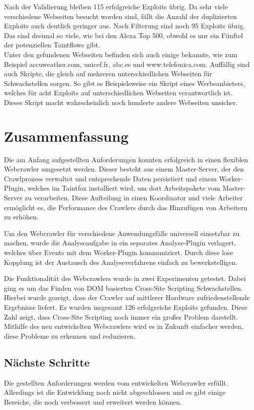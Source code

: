 Nach der Validierung bleiben 115 erfolgreiche Exploits übrig. Da sehr viele verschiedene Webseiten besucht worden sind, fällt die Anzahl der duplizierten Exploits auch deutlich geringer aus. Nach Filterung sind noch 95 Exploits übrig. Das sind dreimal so viele, wie bei den Alexa Top 500, obwohl es nur ein Fünftel der potenziellen Taintflows gibt. \\
Unter den gefundenen Webseiten befinden sich auch einige bekannte, wie zum Beispiel accuweather.com, unicef.fr, abc.es und www.telefonica.com. Auffällig sind auch Skripte, die gleich auf mehreren unterschiedlichen Webseiten für Schwachstellen sorgen. So gibt es Beispielsweise ein Skript eines Werbeanbieters, welches für acht Exploits auf unterschiedlichen Webseiten verantwortlich ist. Dieses Skript macht wahrscheinlich noch hunderte andere Webseiten unsicher.

\chapter{Zusammenfassung}
Die am Anfang aufgestellten Anforderungen konnten erfolgreich in einen flexiblen Webcrawler umgesetzt werden. Dieser besteht aus einem Master-Server, der den Crawlprozess verwaltet und entsprechende Daten persistiert und einem Worker-Plugin, welches im Taintfox installiert wird, um dort Arbeitspakete vom Master-Server zu verarbeiten. Diese Aufteilung in einen Koordinator und viele Arbeiter ermöglicht es, die Performance des Crawlers durch das Hinzufügen von Arbeitern zu erhöhen. 

Um den Webcrawler für verschiedene Anwendungsfälle universell einsetzbar zu machen, wurde die Analyseaufgabe in ein separates Analyse-Plugin verlagert, welches über Events mit dem Worker-Plugin kommuniziert. Durch diese lose Kopplung ist der Austausch des Analyseverfahrens einfach zu bewerkstelligen.

Die Funktionalität des Webcrawlers wurde in zwei Experimenten getestet. Dabei ging es um das Finden von DOM basierten Cross-Site Scripting Schwachstellen. Hierbei wurde gezeigt, dass der Crawler auf mittlerer Hardware zufriedenstellende Ergebnisse liefert. Es wurden insgesamt 126 erfolgreiche Exploits gefunden. Diese Zahl zeigt, dass Cross-Site Scripting noch immer ein großes Problem darstellt. Mithilfe des neu entwickelten Webcrawlers wird es in Zukunft einfacher werden, diese Probleme zu erkennen und reduzieren.

\section{Nächste Schritte}
Die gestellten Anforderungen werden vom entwickelten Webcrawler erfüllt. Allerdings ist die Entwicklung noch nicht abgeschlossen und es gibt einige Bereiche, die noch verbessert und erweitert werden können. 

